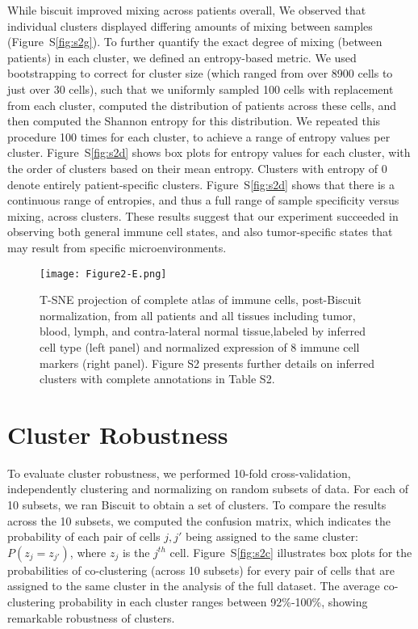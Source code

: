 While biscuit improved mixing across patients overall, We observed that individual clusters displayed differing amounts of mixing between samples (Figure~S\ref{fig:s2g}).
To further quantify the exact degree of mixing (between patients) in each cluster, we defined an entropy-based metric.
We used bootstrapping to correct for cluster size (which ranged from over 8900 cells to just over 30 cells), such that we uniformly sampled 100 cells with replacement from each cluster, computed the distribution of patients across these cells, and then computed the Shannon entropy for this distribution.
We repeated this procedure 100 times for each cluster, to achieve a range of entropy values per cluster.
Figure~S\ref{fig:s2d} shows box plots for entropy values for each cluster, with the order of clusters based on their mean entropy.
Clusters with entropy of 0 denote entirely patient-specific clusters.
Figure~S\ref{fig:s2d} shows that there is a continuous range of entropies, and thus a full range of sample specificity versus mixing, across clusters.
These results suggest that our experiment succeeded in observing both general immune cell states, and also tumor-specific states that may result from specific microenvironments. 

\begin{figure}
\centering
\texttt{[image: Figure2-E.png]}
\caption{T-SNE projection of complete atlas of immune cells, post-Biscuit normalization, from all patients and all tissues including tumor, blood, lymph, and contra-lateral normal tissue,labeled by inferred cell type (left panel) and normalized expression of 8 immune cell markers (right panel). Figure S2 presents further details on inferred clusters with complete annotations in Table S2.
} %
\label{fig:2e}
\end{figure}

\section{Cluster Robustness}

To evaluate cluster robustness, we performed 10-fold cross-validation, independently clustering and normalizing on random subsets of data.
For each of 10 subsets, we ran Biscuit to obtain a set of clusters.
To compare the results across the 10 subsets, we computed the confusion matrix, which indicates the probability of each pair of cells \(j,j'\) being assigned to the same cluster: \(P(z_{j} = z_{j'})\), where $z_j$ is the $j^{th}$ cell.
Figure~S\ref{fig:s2c} illustrates box plots for the probabilities of co-clustering (across 10 subsets) for every pair of cells that are assigned to the same cluster in the analysis of the full dataset.
The average co-clustering probability in each cluster ranges between 92\%-100\%, showing remarkable robustness of clusters.

